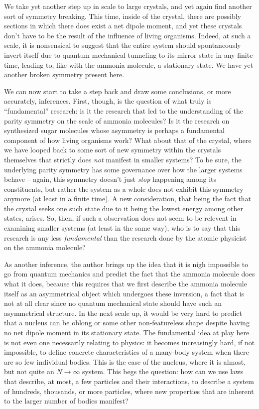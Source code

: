 We take yet another step up in scale to large crystals, and yet again find another sort of symmetry breaking. This time, inside of the crystal, there are possibly sections in which there does exist a net dipole moment, and yet these crystals don't have to be the result of the influence of living organisms. Indeed, at such a scale, it is nonsensical to suggest that the entire system should spontaneously invert itself due to quantum mechanical tunneling to its mirror state in any finite time, leading to, like with the ammonia molecule, a stationary state. We have yet another broken symmetry present here.

We can now start to take a step back and draw some conclusions, or more accurately, inferences. First, though, is the question of what truly is ``fundamental'' research: is it the research that led to the understanding of the parity symmetry on the scale of ammonia molecules? Is it the research on synthesized sugar molecules whose asymmetry is perhaps a fundamental component of how living organisms work? What about that of the crystal, where we have looped back to some sort of new symmetry within the crystals themselves that strictly does \textit{not} manifest in smaller systems? To be sure, the underlying parity symmetry has some governance over how the larger systems behave -- again, this symmetry doesn't just \textit{stop} happening among its constituents, but rather the system as a whole does not exhibit this symmetry anymore (at least in a finite time). A new consideration, that being the fact that the crystal seeks one such state due to it being the lowest energy among other states, arises. So, then, if such a observation does not seem to be relevent in examining smaller systems (at least in the same way), who is to say that this research is any less \textit{fundamental} than the research done by the atomic physicist on the ammonia molecule?

As another inference, the author brings up the idea that it is nigh impossible to go from quantum mechanics and predict the fact that the ammonia molecule does what it does, because this requires that we first describe the ammonia molecule itself as an asymmetrical object which undergoes these inversion, a fact that is not at all clear since no quantum mechanical state should have such an asymmetrical structure. In the next scale up, it would be very hard to predict that a nucleus can be oblong or some other non-featureless shape despite having no net dipole moment in its stationary state. The fundamental idea at play here is not even one necessarily relating to physics: it becomes increasingly hard, if not impossible, to define concrete characteristics of a many-body system when there are so few individual bodies. This is the case of the nucleus, where it is almost, but not quite an $N \rightarrow \infty$ system. This begs the question: how can we use laws that describe, at most, a few particles and their interactions, to describe a system of hundreds, thousands, or more particles, where new properties that are inherent to the larger number of bodies manifest?

